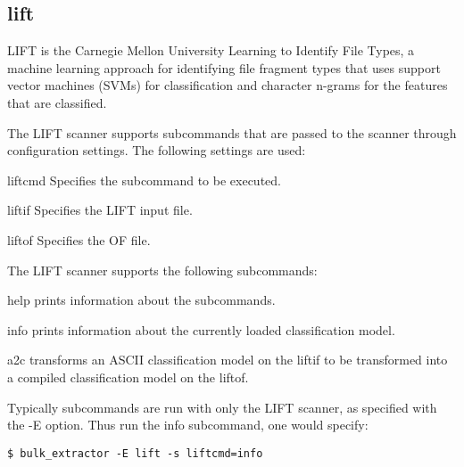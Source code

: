 \subsection{lift}
LIFT is the Carnegie Mellon University Learning to Identify File
Types, a machine learning approach for identifying file fragment types
that uses support vector machines (SVMs) for classification and
character n-grams for the features that are classified.

The LIFT scanner supports subcommands that are passed to the scanner
through configuration settings. The following settings are used:

\begin{compactdesc}
\item[liftcmd] Specifies the subcommand to be executed.
\item[liftif] Specifies the LIFT input file.
\item[liftof] Specifies the OF file.
\end{compactdesc}

The LIFT scanner supports the following subcommands:

\begin{compactdesc}
\item[help] prints information about the subcommands.
\item[info] prints information about the currently loaded
  classification model.
\item[a2c] transforms an ASCII classification model on the liftif to
  be transformed into a compiled classification model on the liftof.
\end{compactdesc}

Typically subcommands are run with only the LIFT scanner, as specified
with the -E option. Thus run the info subcommand, one would specify:

\begin{Verbatim}
$ bulk_extractor -E lift -s liftcmd=info
\end{Verbatim}

